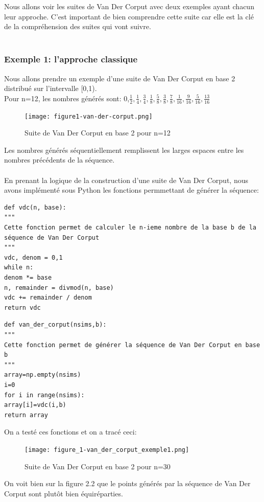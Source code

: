 \documentclass[12pt]{report}
\begin{document}
Nous allons voir les suites de Van Der Corput avec deux exemples ayant chacun leur approche. C'est important de bien comprendre cette suite car elle est la clé de la compréhension des suites qui vont suivre.\\\\

\subsubsection{Exemple 1: l'approche classique}
Nous allons prendre un exemple d'une suite de Van Der Corput en base 2 distribué sur l'intervalle [0,1).\\
Pour n=12, les nombres générés sont: 0,$\frac{1}{2},\frac{1}{4},\frac{3}{4},\frac{1}{8},\frac{5}{8},\frac{3}{8},\frac{7}{8},\frac{1}{16},\frac{9}{16},\frac{5}{16},\frac{13}{16}$\\
\bigbreak
\begin{figure}[h]
	\begin{center}
	\texttt{[image: figure1-van-der-corput.png]}\\
	\end{center}
\caption{Suite de Van Der Corput en base 2 pour n=12}
\end{figure}
Les nombres générés séquentiellement remplissent les larges espaces entre les nombres précédents de la séquence.\\
\\En prenant la logique de la construction d'une suite de Van Der Corput, nous avons implémenté sous Python les fonctions permmettant de générer la séquence:\\
\begin{lstlisting}
def vdc(n, base):
"""
Cette fonction permet de calculer le n-ieme nombre de la base b de la 
séquence de Van Der Corput
"""
vdc, denom = 0,1
while n:
denom *= base
n, remainder = divmod(n, base)
vdc += remainder / denom
return vdc
\end{lstlisting}
\bigbreak

\begin{lstlisting}
def van_der_corput(nsims,b):
"""
Cette fonction permet de générer la séquence de Van Der Corput en base b
"""
array=np.empty(nsims)
i=0
for i in range(nsims):
array[i]=vdc(i,b)
return array
\end{lstlisting}
On a testé ces fonctions et on a tracé ceci:\\
\begin{figure}[h]
	\begin{center}
		\texttt{[image: figure\_1-van\_der\_corput\_exemple1.png]}\\
	\end{center}
	\caption{Suite de Van Der Corput en base 2 pour n=30}
\end{figure}
\medbreak
On voit bien sur la figure 2.2 que le points générés par la séquence de Van Der Corput sont plutôt bien équiréparties.
\end{document}
